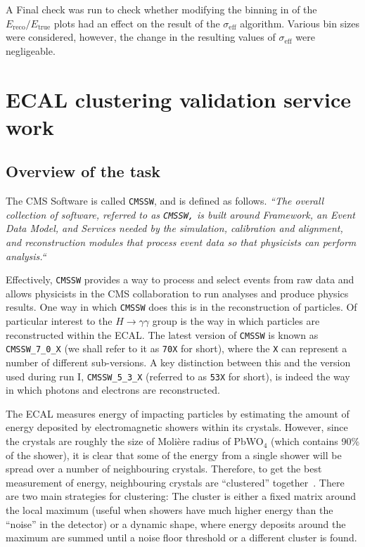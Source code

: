 \documentclass[10pt]{article}
\begin{document}
A Final check was run to check whether modifying the binning in of the $E_{\text{reco}}/E_{\text{true}}$ plots had an effect on the result of the $\sigma_{\text{eff}}$ algorithm. Various bin sizes were considered, however, the change in the resulting values of $\sigma_{\text{eff}}$ were negligeable.

\section{ECAL clustering validation service work}
\subsection{Overview of the task}

The CMS Software is called \texttt{CMSSW}, and is defined as follows. \textit{``The overall collection of software, referred to as \texttt{CMSSW,} is built around Framework, an Event Data Model, and Services needed by the simulation, calibration and alignment, and reconstruction modules that process event data so that physicists can perform analysis.``}~\cite{CMSSW}

Effectively, \texttt{CMSSW} provides a way to process and select events from raw data and allows physicists in the CMS collaboration to run analyses and produce physics results. One way in which \texttt{CMSSW} does this is in the reconstruction of particles. Of particular interest to the $H \rightarrow \gamma \gamma$ group is the way in which particles are reconstructed within the ECAL. The latest version of \texttt{CMSSW} is known as \texttt{CMSSW\_7\_0\_X} (we shall refer to it as \texttt{70X} for short), where the \texttt{X} can represent a number of different sub-versions. A key distinction between this and the version used during run I, \texttt{CMSSW\_5\_3\_X} (referred to as \texttt{53X} for short), is indeed the way in which photons and electrons are reconstructed. 

The ECAL measures energy of impacting particles by estimating the amount of energy deposited by electromagnetic showers within its crystals. However, since the crystals are roughly the size of Molière radius of PbWO$_4$ (which contains 90\% of the shower), it is clear that some of the energy from a single shower will be spread over a number of neighbouring crystals. Therefore, to get the best measurement of energy, neighbouring crystals are ``clustered'' together~\cite{ecalShower}. There are two main strategies for clustering: The cluster is either a fixed matrix around the local maximum  (useful when showers have much higher energy than the ``noise'' in the detector) or a dynamic shape, where energy deposits around the maximum are summed until a noise floor threshold or a different cluster is found. 
\end{document}
